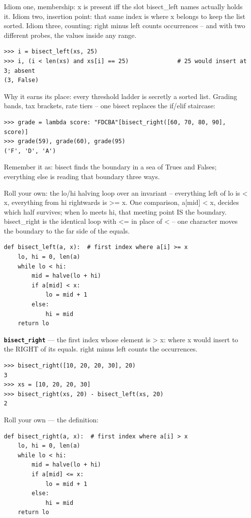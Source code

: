 \documentclass[10pt,letterpaper]{article}
\begin{document}
Idiom one, membership: x is present iff the slot bisect\_left names actually holds it. Idiom two, insertion point: that same index is where x belongs to keep the list sorted. Idiom three, counting: right minus left counts occurrences -- and with two different probes, the values inside any range.

\begin{lstlisting}[style=ex]
>>> i = bisect_left(xs, 25)
>>> i, (i < len(xs) and xs[i] == 25)              # 25 would insert at 3; absent
(3, False)
\end{lstlisting}

Why it earns its place: every threshold ladder is secretly a sorted list. Grading bands, tax brackets, rate tiers -- one bisect replaces the if/elif staircase:

\begin{lstlisting}[style=ex]
>>> grade = lambda score: "FDCBA"[bisect_right([60, 70, 80, 90], score)]
>>> grade(59), grade(60), grade(95)
('F', 'D', 'A')
\end{lstlisting}

Remember it as: bisect finds the boundary in a sea of Trues and Falses; everything else is reading that boundary three ways.


Roll your own: the lo/hi halving loop over an invariant -- everything left of lo is < x, everything from hi rightwards is >= x. One comparison, a[mid] < x, decides which half survives; when lo meets hi, that meeting point IS the boundary. bisect\_right is the identical loop with <= in place of < -- one character moves the boundary to the far side of the equals.

\begin{lstlisting}[style=ex]
def bisect_left(a, x):  # first index where a[i] >= x
    lo, hi = 0, len(a)
    while lo < hi:
        mid = halve(lo + hi)
        if a[mid] < x:
            lo = mid + 1
        else:
            hi = mid
    return lo
\end{lstlisting}
\textbf{\texttt{bisect\_right}} --- the first index whose element is > x: where x would insert to the RIGHT of its equals. right minus left counts the occurrences.
\begin{lstlisting}[style=ex]
>>> bisect_right([10, 20, 20, 30], 20)
3
>>> xs = [10, 20, 20, 30]
>>> bisect_right(xs, 20) - bisect_left(xs, 20)
2
\end{lstlisting}

Roll your own --- the definition:

\begin{lstlisting}[style=ex]
def bisect_right(a, x):  # first index where a[i] > x
    lo, hi = 0, len(a)
    while lo < hi:
        mid = halve(lo + hi)
        if a[mid] <= x:
            lo = mid + 1
        else:
            hi = mid
    return lo
\end{lstlisting}
\end{document}
